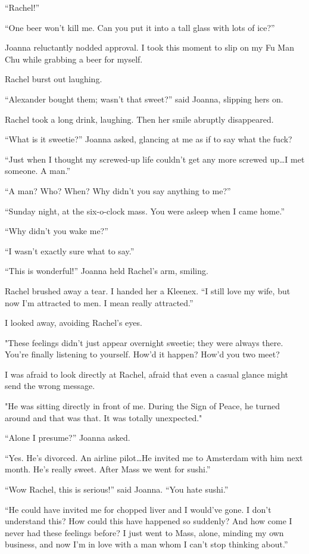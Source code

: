 ``Rachel!''

``One beer won't kill me. Can you put it into a tall glass with lots of
ice?''

Joanna reluctantly nodded approval. I took this moment to slip on my Fu
Man Chu while grabbing a beer for myself.

Rachel burst out laughing.

``Alexander bought them; wasn't that sweet?'' said Joanna, slipping hers
on.

Rachel took a long drink, laughing. Then her smile abruptly disappeared.

``What is it sweetie?'' Joanna asked, glancing at me as if to say what
the fuck?

``Just when I thought my screwed-up life couldn't get any more screwed
up\ldots I met someone. A man.''

``A man? Who? When? Why didn't you say anything to me?''

``Sunday night, at the six-o-clock mass. You were asleep when I came
home.''

``Why didn't you wake me?''

``I wasn't exactly sure what to say.''

``This is wonderful!'' Joanna held Rachel's arm, smiling.

Rachel brushed away a tear. I handed her a Kleenex. ``I still love my
wife, but now I'm attracted to men. I mean really attracted.''

I looked away, avoiding Rachel's eyes.

"These feelings didn't just appear overnight sweetie; they were always
there. You're finally listening to yourself. How'd it happen? How'd you
two meet?

I was afraid to look directly at Rachel, afraid that even a casual
glance might send the wrong message.

"He was sitting directly in front of me. During the Sign of Peace, he
turned around and that was that. It was totally unexpected."

``Alone I presume?'' Joanna asked.

``Yes. He's divorced. An airline pilot\ldots He invited me to Amsterdam
with him next month. He's really sweet. After Mass we went for sushi.''

``Wow Rachel, this is serious!'' said Joanna. ``You hate sushi.''

``He could have invited me for chopped liver and I would've gone. I
don't understand this? How could this have happened so suddenly? And how
come I never had these feelings before? I just went to Mass, alone,
minding my own business, and now I'm in love with a man whom I can't
stop thinking about.''

